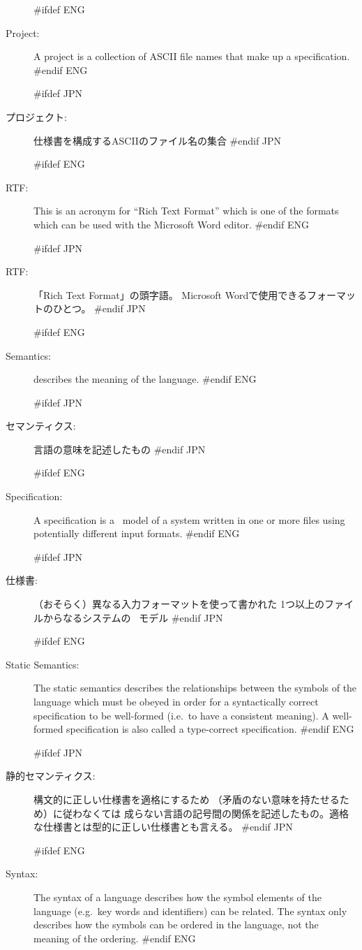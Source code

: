 \begin{description}
#ifdef ENG
\item[Project:] A project is a collection of ASCII file names that make up
  a specification.
#endif ENG

#ifdef JPN
\item[プロジェクト:] 仕様書を構成するASCIIのファイル名の集合
#endif JPN

#ifdef ENG
\item[RTF:] This is an acronym for ``Rich Text Format'' which is one
of the formats which can be used with the Microsoft Word editor.
#endif ENG

#ifdef JPN
\item[RTF:] 「Rich Text Format」の頭字語。
  Microsoft Wordで使用できるフォーマットのひとつ。
#endif JPN

#ifdef ENG
\item[Semantics:] describes the meaning of the language. 
#endif ENG

#ifdef JPN
\item[セマンティクス:] 言語の意味を記述したもの
#endif JPN

#ifdef ENG
\item[Specification:] A specification is a \vdmslpp\ model of a system
  written in one or more files using potentially different input formats.
#endif ENG
  
#ifdef JPN
\item[仕様書:] （おそらく）異なる入力フォーマットを使って書かれた
  1つ以上のファイルからなるシステムの \vdmslpp\ モデル
#endif JPN
  
#ifdef ENG
\item[Static Semantics:] The static semantics describes the
  relationships between the symbols of the language which must be
  obeyed in order for a syntactically correct specification to be
  well-formed (i.e.\ to have a consistent meaning). A well-formed
  specification is also called a type-correct specification.  
#endif ENG

#ifdef JPN
\item[静的セマンティクス:] 構文的に正しい仕様書を適格にするため
  （矛盾のない意味を持たせるため）に従わなくては
  成らない言語の記号間の関係を記述したもの。適格な仕様書とは型的に正しい仕様書とも言える。
#endif JPN

#ifdef ENG
\item[Syntax:] The syntax of a language describes how the symbol
  elements of the language (e.g.\ key words and identifiers) can be related.
  The syntax only describes how the symbols can be ordered in the
  language, not the meaning of the ordering.
#endif ENG


\end{description}
